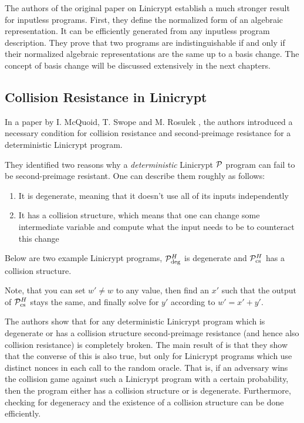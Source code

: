 The authors of the original paper on Linicrypt \cite{C:CarRos16} establish a much stronger result for inputless programs.
First, they define the normalized form of an algebraic representation.
It can be efficiently generated from any inputless program description.
They prove that two programs are indistinguishable if and only if their normalized algebraic representations are the same up to a basis change.
The concept of basis change will be discussed extensively in the next chapters.

\subsection{Collision Resistance in Linicrypt}

In a paper by I. McQuoid, T. Swope and M. Rosulek
\cite[Characterizing Collision and Second-Preimage Resistance in Linicrypt]{TCC:McQSwoRos19},
the authors introduced a necessary condition for collision resistance
and second-preimage resistance for a deterministic Linicrypt program.

They identified two reasons why a \textit{deterministic} Linicrypt $\P$ program can fail to be second-preimage resistant.
One can describe them roughly as follows:
\begin{enumerate}
  \item It is degenerate, meaning that it doesn't use all of its inputs independently
  \item It has a collision structure,
    which means that one can change some intermediate variable and compute what the input needs to be to counteract this change
\end{enumerate}

Below are two example Linicrypt programs, $\P^\H_\textrm{deg}$ is degenerate and $\P^\H_\textrm{cs}$ has a collision structure.
\begin{pchstack}[center,space=2cm]
\end{pchstack}
Note, that you can set $w' \neq w$ to any value,
then find an $x'$ such that the output of $\P^\H_{\textrm{cs}}$ stays the same,
and finally solve for $y'$ according to $w' = x' + y'$.

The authors show that for any deterministic Linicrypt program which is degenerate
or has a collision structure
second-preimage resistance (and hence also collision resistance) is completely broken.
The main result of \cite{C:CarRos16} is that they show that the converse of this is also true,
but only for Linicrypt programs which use distinct nonces in each call to the random oracle.
That is, if an adversary wins the collision game against such a Linicrypt program with a certain probability,
then the program either has a collision structure or is degenerate.
Furthermore, checking for degeneracy and the existence of a collision structure can be done efficiently.

